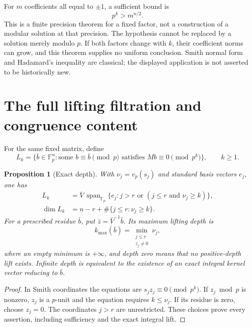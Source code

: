 \documentclass[11pt,a4paper,oneside]{report}
\newtheorem{proposition}[theorem]{Proposition}
\theoremstyle{definition}
\theoremstyle{remark}
\newcommand{\F}{\mathbb F}
\begin{document}
For $m$ coefficients all equal to $\pm1$, a sufficient bound is
\begin{equation}\label{M04:eq:signbound}
p^k>m^{n/2}.
\end{equation}
This is a finite precision theorem for a fixed factor, not a construction
of a modular solution at that precision. The hypothesis cannot be
replaced by a solution merely modulo $p$. If both factors change with
$k$, their coefficient norms can grow, and this theorem supplies no
uniform conclusion. Smith normal form and Hadamard's inequality are
classical; the displayed application is not asserted to be historically new.

\section{The full lifting filtration and congruence content}

For the same fixed matrix, define
\[
L_k=\{\bar b\in\F_p^n:\text{some }b\equiv\bar b\pmod p
\text{ satisfies }Mb\equiv0\pmod{p^k}\},\qquad k\ge1.
\]

\begin{proposition}[Exact depth]\label{M04:prop:depth}
With $\nu_j=v_p(s_j)$ and standard basis vectors $e_j$, one has
\begin{align}
L_k&=\bar V\,\operatorname{span}_{\F_p}
\{e_j:j>r\text{ or }(j\le r\text{ and }\nu_j\ge k)\},\label{M04:eq:filtration}\\
\dim L_k&=n-r+\#\{j\le r:\nu_j\ge k\}.\label{M04:eq:dimension}
\end{align}
For a prescribed residue $\bar b$, put $\bar z=\bar V^{-1}\bar b$.
Its maximum lifting depth is
\begin{equation}\label{M04:eq:maxdepth}
k_{\max}(\bar b)=\min_{\substack{j\le r\\\bar z_j\ne0}} \nu_j,
\end{equation}
where an empty minimum is $+\infty$, and depth zero means that no
positive-depth lift exists. Infinite depth is equivalent to
the existence of an exact integral kernel vector reducing to $\bar b$.
\end{proposition}
\begin{proof}
In Smith coordinates the equations are $s_jz_j\equiv0\pmod{p^k}$.
If $z_j\bmod p$ is nonzero, $z_j$ is a $p$-unit and the equation
requires $k\le\nu_j$. If its residue is zero, choose $z_j=0$.
The coordinates $j>r$ are unrestricted. These choices prove every
assertion, including sufficiency and the exact integral lift.
\end{proof}
\end{document}
